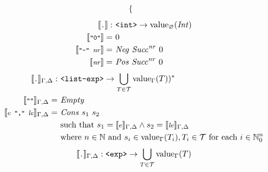 \documentclass[]{scrbook}
\newcommand{\mf}[1]{\text{\texttt{#1}}}
\newcommand{\semantic}[1]{\llbracket \text{\footnotesize\texttt{#1}} \rrbracket}
\theoremstyle{definition}
\theoremstyle{definition}
\theoremstyle{definition}
\theoremstyle{remark}
\begin{document}
\[\begin{aligned}
\begin{cases}
      \end{cases}
\end{aligned}
\] \[
\begin{aligned}
\semantic{.}:\ &\mf{<int>}\to\text{value}_\varnothing(\mathit{Int})\\
\semantic{"0"} =\ & 0\\
\semantic{"-" $\mathit{nr}$} =\ & \mathit{Neg} \ \mathit{Succ}^\mathit{nr} \ 0\\
\semantic{$\mathit{nr}$} =\ & \mathit{Pos} \ \mathit{Succ}^\mathit{nr} \ 0
\end{aligned}
\] \[
\begin{aligned}
\semantic{.}_{\Gamma,\Delta}:\ &\mf{<list-exp>}\to\bigcup_{T\in\mathcal{T}}\text{value}_\Gamma(T))^*\\
\semantic{""}_{\Gamma,\Delta} =\ & \mathit{Empty}\\
\semantic{$e$ "," $\mathit{le}$}_{\Gamma,\Delta} =\ & \mathit{Cons} \ s_1 \ s_2\\
    & \text{such that } s_1 = \semantic{$e$}_{\Gamma,\Delta} \land s_2 = \semantic{$\mathit{le}$}_{\Gamma,\Delta}\\
    & \text{where } n\in\mathbb{N} \text{ and } s_i\in\text{value}_\Gamma(T_i),T_i\in\mathcal{T} \text{ for each } i\in\mathbb{N}_0^n
\end{aligned}
\]
\[\semantic{.}_{\Gamma,\Delta}:\mf{<exp>}\to\bigcup_{T\in\mathcal{T}}\text{value}_\Gamma(T)\]
\end{document}
